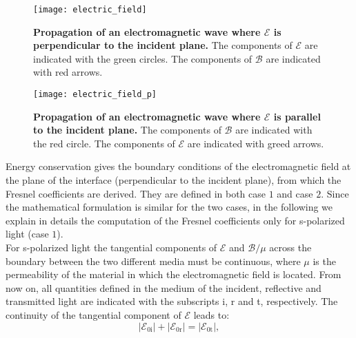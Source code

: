 \begin{figure}[t]
 \label{fig:electric_field}
     \begin{center}
     \texttt{[image: electric\_field]}
     \end{center}
     \caption{\textbf{Propagation of an electromagnetic wave where $\boldsymbol{\mathcal{E}}$ is perpendicular to the incident plane.} The components of $\boldsymbol{\mathcal{E}}$ are indicated with the green circles.
The components of $\boldsymbol{\mathcal{B}}$ are indicated with red arrows.}
\label{fig:electric_field}
 \end{figure}
\begin{figure}[t]
 \label{fig:electric_field_p}
     \begin{center}
     \texttt{[image: electric\_field\_p]}
     \end{center}
 \caption{\textbf{Propagation of an electromagnetic wave where $\boldsymbol{\mathcal{E}}$ is parallel to the incident plane.} The components of $\boldsymbol{\mathcal{B}}$ are indicated with the red circle.
The components of $\boldsymbol{\mathcal{E}}$ are indicated with greed arrows.}
\label{fig:electric_field_p}
 \end{figure}
Energy conservation gives the boundary conditions of the electromagnetic field at the plane of the interface (perpendicular to the incident plane), from which the Fresnel coefficients are derived. They are defined in both case $1$ and case $2$. Since the mathematical formulation is similar for the two cases, in the following we explain in details the computation of the Fresnel coefficients only for s-polarized light (case $1$).\\ 
\indent For s-polarized light the tangential components of $\boldsymbol{\mathcal{E}}$ and $\boldsymbol{\mathcal{B}}/\mu$ across the boundary between the two different media must be continuous, where $\mu$ is the permeability of the material in which the electromagnetic field is located. From now on, all quantities defined in the medium of the incident, reflective and transmitted light are indicated with the subscripts \textrm{i}, \textrm{r} and \textrm{t}, respectively. The continuity of the tangential component of $\boldsymbol{\mathcal{E}}$ leads to:
\begin{equation}\label{Econservation}
|\boldsymbol{\mathcal{E}}_{0\textrm{i}}|+|\boldsymbol{\mathcal{E}}_{0\textrm{r}}|= |\boldsymbol{\mathcal{E}}_{0\textrm{t}}|,
\end{equation} 
